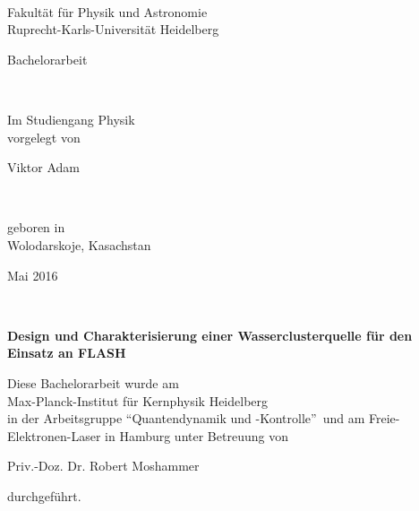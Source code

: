 
~
\clearpage 
\thispagestyle{empty}

\begin{center}
  \renewcommand{\baselinestretch}{2.00}
  \Large\sffamily 
  Fakultät für Physik und Astronomie\\
  \large 
  Ruprecht-Karls-Universität Heidelberg
  \par\vfill\normalfont
  \begin{Large}Bachelorarbeit\end{Large}\\
\begin{normalsize}  Im Studiengang Physik\\
  vorgelegt von\\\end{normalsize}
  \begin{Large}Viktor Adam\end{Large}\\
\begin{normalsize}  geboren in\\
  Wolodarskoje, Kasachstan \\\end{normalsize}
  \begin{Large}Mai 2016\end{Large}
\end{center}
\clearpage ~
\thispagestyle{empty}
\clearpage

\thispagestyle{empty}

\begin{center}
  \renewcommand{\baselinestretch}{1.50}
  \Large\bfseries\sffamily
    Design und Charakterisierung einer Wasserclusterquelle für den Einsatz an FLASH\\
  \vfill
  \normalfont
\begin{normalsize}  Diese Bachelorarbeit wurde am \\
  Max-Planck-Institut für Kernphysik Heidelberg \\
  in der Arbeitsgruppe \enquote{Quantendynamik und -Kontrolle}\ und am Freie-Elektronen-Laser in Hamburg unter Betreuung von \\\end{normalsize}
   Priv.-Doz. Dr. Robert Moshammer \\
 \begin{normalsize}  durchgeführt.\end{normalsize}
\end{center} %
\vspace{5\baselineskip}

\renewcommand{\baselinestretch}{1.00}\normalsize


\clearpage ~
\thispagestyle{empty}
\clearpage
